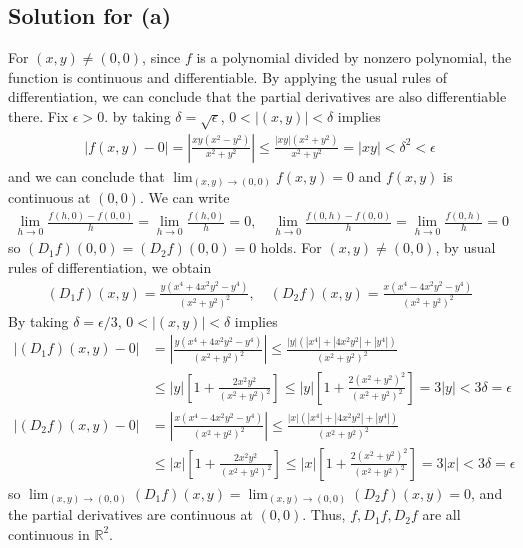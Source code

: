 \documentclass{scrartcl}
\begin{document}
\subsection{Solution for (a)}
For \((x, y) \not = (0, 0)\), since \(f\) is a polynomial divided by nonzero
polynomial, the function is continuous and differentiable. By applying the
usual rules of differentiation, we can conclude that the partial derivatives
are also differentiable there. Fix \(\epsilon > 0\). by taking \(\delta =
\sqrt{\epsilon}\), \(0 < |(x, y)| < \delta\) implies
\begin{align*}
  |f(x, y) - 0|
  = \left| \frac{xy (x^2 - y^2)}{x^2 + y^2} \right|
  \le \frac{|xy| (x^2 + y^2)}{x^2 + y^2}
  = |xy|
  < \delta^2
  < \epsilon
\end{align*}
and we can conclude that \(\lim_{(x, y) \to (0, 0)} f(x, y) = 0\) and \(f(x,
y)\) is continuous at \((0, 0)\). We can write
\begin{align*}
  \lim_{h \to 0} \frac{f(h, 0) - f(0, 0)}{h}
  = \lim_{h \to 0} \frac{f(h, 0)}{h}
  = 0, \quad
  \lim_{h \to 0} \frac{f(0, h) - f(0, 0)}{h}
  = \lim_{h \to 0} \frac{f(0, h)}{h}
  = 0
\end{align*}
so \((D_1 f) (0, 0) = (D_2 f) (0, 0) = 0\) holds. For \((x, y) \not = (0, 0)\),
by usual rules of differentiation, we obtain
\begin{align*}
  (D_1 f) (x, y)
  = \frac{y(x^4 + 4x^2 y^2 - y^4)}{(x^2 + y^2)^2}, \quad
  (D_2 f) (x, y)
  = \frac{x(x^4 - 4x^2 y^2 - y^4)}{(x^2 + y^2)^2}
\end{align*}
By taking \(\delta = \epsilon / 3\), \(0 < |(x, y)| < \delta\) implies
\begin{align*}
  |(D_1 f) (x, y) - 0|
  &= \left| \frac{y(x^4 + 4x^2 y^2 - y^4)}{(x^2 + y^2)^2} \right|
  \le \frac{|y| (|x^4| + |4x^2 y^2| +|y^4|)}{(x^2 + y^2)^2} \\
  &\le |y| \left[ 1 + \frac{2x^2 y^2}{(x^2 + y^2)^2} \right]
  \le |y| \left[ 1 + \frac{2(x^2 + y^2)^2}{(x^2 + y^2)^2} \right]
  = 3|y|
  < 3\delta
  = \epsilon \\
  |(D_2 f) (x, y) - 0|
  &= \left| \frac{x(x^4 - 4x^2 y^2 - y^4)}{(x^2 + y^2)^2} \right|
  \le \frac{|x| (|x^4| + |4x^2 y^2| +|y^4|)}{(x^2 + y^2)^2} \\
  &\le |x| \left[ 1 + \frac{2x^2 y^2}{(x^2 + y^2)^2} \right]
  \le |x| \left[ 1 + \frac{2(x^2 + y^2)^2}{(x^2 + y^2)^2} \right]
  = 3|x|
  < 3\delta
  = \epsilon
\end{align*}
so \(\lim_{(x, y) \to (0, 0)} (D_1 f) (x, y) = \lim_{(x, y) \to (0, 0)} (D_2 f)
(x, y) = 0\), and the partial derivatives are continuous at \((0, 0)\). Thus,
\(f, D_1 f, D_2 f\) are all continuous in \(\mathbb{R}^2\).
\end{document}
